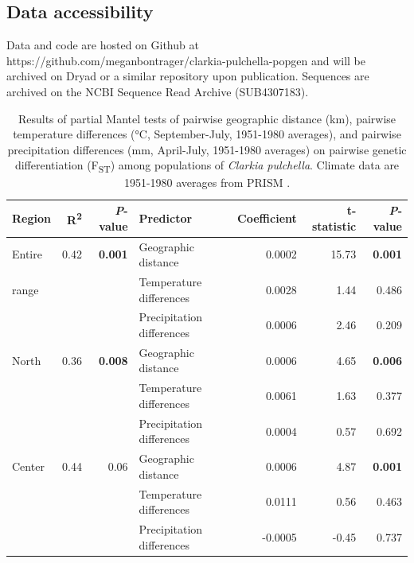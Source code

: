 \documentclass{article}
\begin{document}
\subsection*{Data accessibility}

Data and code are hosted on Github at https://github.com/meganbontrager/clarkia-pulchella-popgen and will be archived on Dryad or a similar repository upon publication. Sequences are archived on the NCBI Sequence Read Archive (SUB4307183).

\clearpage




\clearpage

\begin{table}[ht]
\centering
\caption[Results of partial Mantel tests of pairwise differences]{Results of partial Mantel tests of pairwise geographic distance (km), pairwise temperature differences (\si{\degree}C, September-July, 1951-1980 averages), and pairwise precipitation differences (mm, April-July, 1951-1980 averages) on pairwise genetic differentiation (F\textsubscript{ST}) among populations of \textit{Clarkia pulchella}. Climate data are 1951-1980 averages from PRISM \citep{PRISM}.}
\label{mantel}
\begin{tabular}{lrrlrrr}
\toprule
Region & R\textsuperscript{2}	& \textit{P}-value & Predictor & Coefficient & t-statistic & \textit{P}-value \\
\midrule
Entire  &	0.42 &	\textbf{0.001} &	Geographic distance &	0.0002 &	15.73 &	\textbf{0.001} \\
range	&	&	& Temperature differences &	0.0028 &	1.44 &	0.486 \\
	&	&	& Precipitation differences &	0.0006 &	2.46 &	0.209 \\
\midrule
North	& 0.36 &	\textbf{0.008} &	Geographic distance &	0.0006 &	4.65 &	\textbf{0.006} \\
	&	&	&	Temperature differences &	0.0061 &	1.63 &	0.377 \\
	&	&	&	Precipitation differences &	0.0004 &	0.57 &	0.692 \\
\midrule
Center &	0.44 &	0.06 &	Geographic distance &	0.0006 &	4.87 &	\textbf{0.001} \\
	&	&	&	Temperature differences &	0.0111 &	0.56 &	0.463 \\
	&	&	&	Precipitation differences &	-0.0005 &	-0.45 &	0.737 \\
\bottomrule
\end{tabular}
\end{table}
\end{document}

